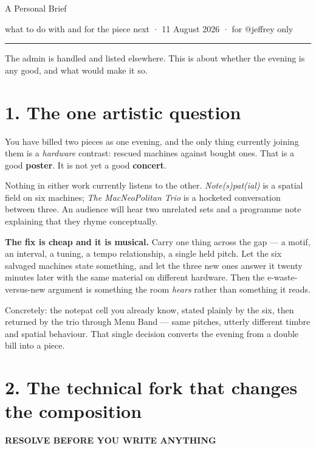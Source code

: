 \documentclass[11pt]{article}
\renewcommand{\packettitle}[2]{%
  {\acbold\fontsize{31pt}{33pt}\selectfont\color{acdark}#1\par}%
  \vspace{0.42em}%
  {\normalfont\fontsize{13.5pt}{16pt}\selectfont\color{acpink}#2\par}%
  \vspace{0.5em}\color{acpink}\rule{\linewidth}{1.2pt}\color{black}}
\newcommand{\bigq}[1]{%
  \begingroup\setlength{\fboxsep}{12pt}%
  \noindent\colorbox{acpale}{%
    \begin{minipage}{\dimexpr\linewidth-2\fboxsep\relax}
    \fontsize{14pt}{18pt}\selectfont\color{acdark}#1
    \end{minipage}}%
  \endgroup\par\vspace{0.8em}}
\newcommand{\stamp}[2]{%
  \begingroup\setlength{\fboxsep}{4pt}%
  \colorbox{#1}{\color{white}\bfseries\fontsize{9pt}{11pt}\selectfont #2}%
  \endgroup}
\begin{document}
\packettitle{A Personal Brief}{what to do with and for the piece next · 11 August 2026 · for @jeffrey only}

\vspace{0.5em}
{\RaggedRight
 \normalfont\fontsize{15pt}{19pt}\selectfont\color{acpink}%
 The admin is handled and listed elsewhere. This is about whether the evening is
 any good, and what would make it so.\par}

\vspace{1.4em}

\section{1. The one artistic question}

\bigq{You have billed two pieces as one evening, and the only thing currently
joining them is a \emph{hardware} contrast: rescued machines against bought ones.
That is a good \textbf{poster}. It is not yet a good \textbf{concert}.}

Nothing in either work currently listens to the other. \emph{Note(s)pat(ial)} is
a spatial field on six machines; \emph{The MacNeoPolitan Trio} is a hocketed
conversation between three. An audience will hear two unrelated sets and a
programme note explaining that they rhyme conceptually.

\textbf{The fix is cheap and it is musical.} Carry one thing across the gap — a
motif, an interval, a tuning, a tempo relationship, a single held pitch. Let the
six salvaged machines state something, and let the three new ones answer it
twenty minutes later with the same material on different hardware. Then the
e-waste-versus-new argument is something the room \emph{hears} rather than
something it reads.

Concretely: the notepat cell you already know, stated plainly by the six, then
returned by the trio through Menu Band — same pitches, utterly different timbre
and spatial behaviour. That single decision converts the evening from a double
bill into a piece.

\section{2. The technical fork that changes the composition}

\stamp{acorange}{RESOLVE BEFORE YOU WRITE ANYTHING}
\end{document}
